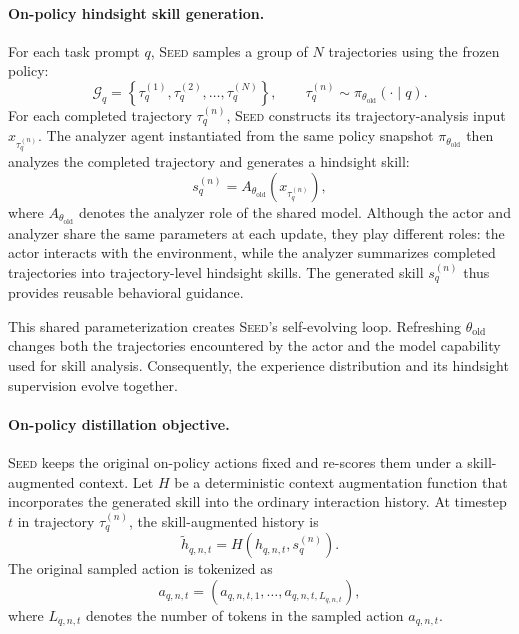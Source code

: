 \paragraph{On-policy hindsight skill generation.}
For each task prompt $q$, \textsc{Seed} samples a group of $N$ trajectories using the frozen policy:
\[
\mathcal{G}_q
=
\left\{
\tau_q^{(1)}, \tau_q^{(2)}, \ldots, \tau_q^{(N)}
\right\},
\qquad
\tau_q^{(n)}
\sim
\pi_{\theta_{\mathrm{old}}}
\left(
\cdot \mid q
\right).
\]
For each completed trajectory $\tau_q^{(n)}$, \textsc{Seed} constructs its trajectory-analysis input $x_{\tau_q^{(n)}}$. The analyzer agent instantiated from the same policy snapshot $\pi_{\theta_{\mathrm{old}}}$ then analyzes the completed trajectory and generates a hindsight skill:
\[
s_q^{(n)}
=
A_{\theta_{\mathrm{old}}}
\left(
x_{\tau_q^{(n)}}
\right),
\]
where $A_{\theta_{\mathrm{old}}}$ denotes the analyzer role of the shared model. Although the actor and analyzer share the same parameters at each update, they play different roles: the actor interacts with the environment, while the analyzer summarizes completed trajectories into trajectory-level hindsight skills. The generated skill $s_q^{(n)}$ thus provides reusable behavioral guidance.

This shared parameterization creates \textsc{Seed}'s self-evolving loop. Refreshing $\theta_{\mathrm{old}}$ changes both the trajectories encountered by the actor and the model capability used for skill analysis. Consequently, the experience distribution and its hindsight supervision evolve together.

\paragraph{On-policy distillation objective.}
\textsc{Seed} keeps the original on-policy actions fixed and re-scores them under a skill-augmented context. Let $H$ be a deterministic context augmentation function that incorporates the generated skill into the ordinary interaction history. At timestep $t$ in trajectory $\tau_q^{(n)}$, the skill-augmented history is
\[
\tilde{h}_{q,n,t}
=
H
\left(
h_{q,n,t},
s_q^{(n)}
\right).
\]
The original sampled action is tokenized as
\[
a_{q,n,t}
=
\left(
a_{q,n,t,1},
\ldots,
a_{q,n,t,L_{q,n,t}}
\right),
\]
where $L_{q,n,t}$ denotes the number of tokens in the sampled action $a_{q,n,t}$.

